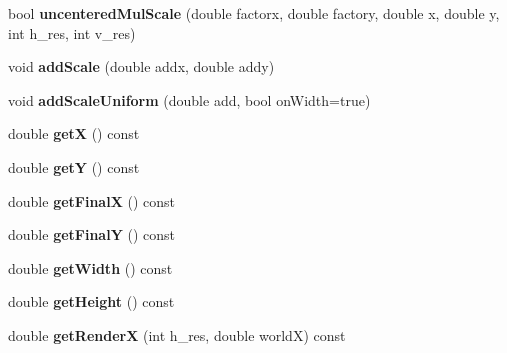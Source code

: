 \begin{DoxyCompactItemize}
\item 
\hypertarget{class_camera_a6da74cb911cf06f04bfaf38418fc77a9}{}bool {\bfseries uncentered\+Mul\+Scale} (double factorx, double factory, double x, double y, int h\+\_\+res, int v\+\_\+res)\label{class_camera_a6da74cb911cf06f04bfaf38418fc77a9}

\item 
\hypertarget{class_camera_ae21745d73e59d4a4a4e27a12a9cf91cb}{}void {\bfseries add\+Scale} (double addx, double addy)\label{class_camera_ae21745d73e59d4a4a4e27a12a9cf91cb}

\item 
\hypertarget{class_camera_a1f42a416c08d8328a4f6723bf7feafd9}{}void {\bfseries add\+Scale\+Uniform} (double add, bool on\+Width=true)\label{class_camera_a1f42a416c08d8328a4f6723bf7feafd9}

\item 
\hypertarget{class_camera_a379f195daa407ca0a9e76f47dae01ea2}{}double {\bfseries get\+X} () const \label{class_camera_a379f195daa407ca0a9e76f47dae01ea2}

\item 
\hypertarget{class_camera_a7f40c406bf769ac6fd6f3898f661f9b6}{}double {\bfseries get\+Y} () const \label{class_camera_a7f40c406bf769ac6fd6f3898f661f9b6}

\item 
\hypertarget{class_camera_abb31feca14c773a36d08d44d19f957ba}{}double {\bfseries get\+Final\+X} () const \label{class_camera_abb31feca14c773a36d08d44d19f957ba}

\item 
\hypertarget{class_camera_a842f8054c5348f32df5df432d88e9560}{}double {\bfseries get\+Final\+Y} () const \label{class_camera_a842f8054c5348f32df5df432d88e9560}

\item 
\hypertarget{class_camera_aee1e6f2957c75bb15068cd94d5cf08c4}{}double {\bfseries get\+Width} () const \label{class_camera_aee1e6f2957c75bb15068cd94d5cf08c4}

\item 
\hypertarget{class_camera_a8ce5a105319bd85379b669b004b1b3c9}{}double {\bfseries get\+Height} () const \label{class_camera_a8ce5a105319bd85379b669b004b1b3c9}

\item 
\hypertarget{class_camera_aeb960f4f7775bbc7abb34b8d7f667866}{}double {\bfseries get\+Render\+X} (int h\+\_\+res, double world\+X) const \label{class_camera_aeb960f4f7775bbc7abb34b8d7f667866}


\end{DoxyCompactItemize}
